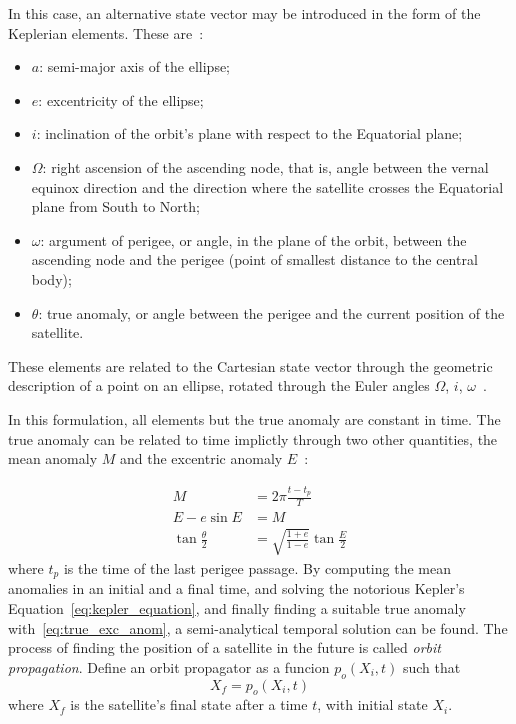 In this case, an alternative state vector may be introduced in the form of the Keplerian elements. These are~\cite{curtis2015orbital}:
\begin{itemize}
    \item \(a\): semi-major axis of the ellipse;
    \item \(e\): excentricity of the ellipse;
    \item \(i\): inclination of the orbit's plane with respect to the Equatorial plane;
    \item \(\Omega \): right ascension of the ascending node, that is, angle between the vernal equinox direction and the direction where the satellite crosses the Equatorial plane from South to North;
    \item \(\omega \): argument of perigee, or angle, in the plane of the orbit, between the ascending node and the perigee (point of smallest distance to the central body);
    \item \(\theta \): true anomaly, or angle between the perigee and the current position of the satellite.
\end{itemize}

These elements are related to the Cartesian state vector through the geometric description of a point on an ellipse, rotated through the Euler angles \(\Omega\), \(i\), \(\omega\)~\cite{curtis2015orbital}.


In this formulation, all elements but the true anomaly are constant in time. The true anomaly can be related to time implictly through two other quantities, the mean anomaly \(M\) and the excentric anomaly \(E\)~\cite{curtis2015orbital}:

\begin{align} 
        M &= 2\pi \frac{t - t_p}{T} \\
        E - e \sin{E} &= M \label{eq:kepler_equation}\\
        \tan{\frac{\theta}{2}} &= \sqrt{\frac{1+e}{1-e}} \tan{\frac{E}{2}} \label{eq:true_exc_anom}
\end{align}
where \(t_p\) is the time of the last perigee passage. By computing the mean anomalies in an initial and a final time, and solving the notorious Kepler's Equation~\eqref{eq:kepler_equation}, and finally finding a suitable true anomaly with~\eqref{eq:true_exc_anom}, a semi-analytical temporal solution can be found. The process of finding the position of a satellite in the future is called \textit{orbit propagation}. Define an orbit propagator as a funcion \(p_o(X_i, t)\) such that
\begin{equation} \label{eq:orbit_propagator}
    X_f = p_o(X_i, t)
\end{equation}
where \(X_f\) is the satellite's final state after a time \(t\), with initial state \(X_i\).

